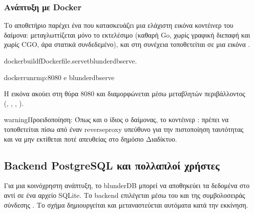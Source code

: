 \documentclass[letterpaper,10pt,greek]{sphinxmanual}
\begin{document}
\subsubsection{Ανάπτυξη με Docker}
\label{\detokenize{mode_headless:deploiement-avec-docker}}\label{\detokenize{mode_headless:headless-docker}}
\sphinxAtStartPar
Το αποθετήριο παρέχει ένα  που κατασκευάζει μια ελάχιστη εικόνα κοντέινερ του δαίμονα: μεταγλωττίζεται μόνο το εκτελέσιμο  (καθαρή Go, χωρίς γραφική διεπαφή και χωρίς CGO, άρα στατικά συνδεδεμένο), και στη συνέχεια τοποθετείται σε μια εικόνα .

\begin{sphinxVerbatim}[commandchars=\\\{\}]
dockerbuild\PYGZhy{}fDockerfile.serve\PYGZhy{}tblunderdb\PYGZhy{}serve.

dockerrun\PYGZhy{}\PYGZhy{}rm\PYGZhy{}p:8080
\PYGZhy{}e
blunderdb\PYGZhy{}serve
\end{sphinxVerbatim}

\sphinxAtStartPar
Η εικόνα ακούει στη θύρα 8080 και διαμορφώνεται μέσω μεταβλητών περιβάλλοντος (, , , ).

\begin{sphinxadmonition}{warning}{Προειδοποίηση:}
\sphinxAtStartPar
Όπως και ο ίδιος ο δαίμονας, το κοντέινερ : πρέπει να τοποθετείται πίσω από έναν reverse\sphinxhyphen{}proxy υπεύθυνο για την πιστοποίηση ταυτότητας και να μην εκτίθεται ποτέ απευθείας στο δημόσιο Διαδίκτυο.
\end{sphinxadmonition}


\subsection{Backend PostgreSQL και πολλαπλοί χρήστες}
\label{\detokenize{mode_headless:backend-postgresql-et-multi-utilisateurs}}\label{\detokenize{mode_headless:headless-postgres}}
\sphinxAtStartPar
Για μια κοινόχρηστη ανάπτυξη, το blunderDB μπορεί να αποθηκεύει τα δεδομένα στο  αντί σε ένα αρχείο SQLite. Το backend επιλέγεται μέσω του  και της συμβολοσειράς σύνδεσης . Το σχήμα δημιουργείται και μεταναστεύεται αυτόματα κατά την εκκίνηση.
\end{document}
